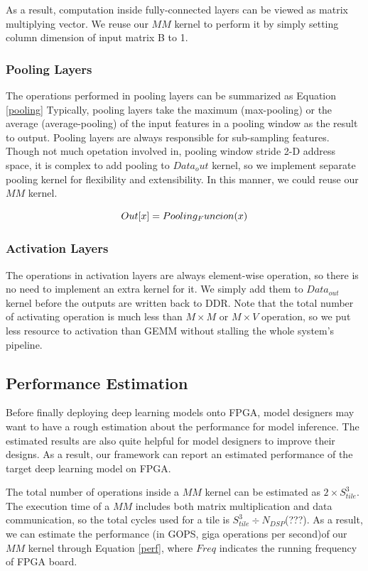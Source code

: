 \documentclass{acm_proc_article-sp-copy}
\begin{document}
As a result, computation inside fully-connected layers can be viewed as matrix multiplying vector. We reuse our $MM$ kernel to perform it by simply setting column dimension of input matrix B to 1. 


\subsubsection{Pooling Layers}
The operations performed in pooling layers can be summarized as Equation \ref{pooling}
Typically, pooling layers take the maximum (max-pooling) or the average (average-pooling) of the input features in a pooling window as the result to output. Pooling layers are always responsible for sub-sampling features. Though not much opetation involved in, pooling window stride 2-D address space, it is complex to add pooling to $Data_out$ kernel, so we implement separate pooling kernel for flexibility and extensibility.
In this manner, we could reuse our $MM$ kernel.

\begin{equation}
\centering
Out[x]= Pooling_Funcion(x)
\label{conv}
\end{equation}

\subsubsection{Activation Layers}
The operations in activation layers are always element-wise operation, so there is no need to implement an extra kernel for it. We simply add them to $Data_{out}$ kernel before the outputs are written back to DDR. Note that the total number of activating operation is much less than $M\times M$ or $M\times V$ operation, so we put less resource to activation than GEMM without stalling the whole system's pipeline.

\subsection{Performance Estimation}
Before finally deploying deep learning models onto FPGA, model designers may want to have a rough estimation about the performance for model inference. The estimated results are also quite helpful for model designers to improve their designs. As a result, our framework can report an estimated performance of the target deep learning model on FPGA.  

The total number of operations inside a $MM$ kernel can be estimated as  $2\times S_{tile}^3$. The execution time of a $MM$ includes both matrix multiplication and data communication, so the total cycles used for a tile is $S_{tile}^3 \div N_{DSP}$(???).
As a result, we can estimate the performance (in GOPS, giga operations per second)of our $MM$ kernel through Equation \ref{perf}, where $Freq$ indicates the running frequency of FPGA board.
\end{document}
